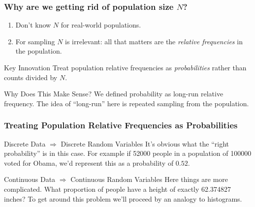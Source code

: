 \documentclass[handout]{beamer}
\begin{document}
\begin{frame}
\frametitle{Why are we getting rid of population size $N$?}

 
\begin{enumerate}
	\item Don't know $N$ for real-world populations. 
	\item For sampling $N$ is irrelevant: all that matters are the \alert{\emph{relative frequencies}} in the population. 
\end{enumerate}

\begin{block}{Key Innovation}
Treat population relative frequencies as \emph{probabilities} rather than counts divided by $N$.
\end{block}
 
\begin{block}{Why Does This Make Sense?}
We defined probability as long-run relative frequency. The idea of ``long-run'' here is repeated sampling from the population.
\end{block}

\end{frame}
\begin{frame}
\frametitle{Treating Population Relative Frequencies as Probabilities}
 
\begin{block}{Discrete Data $\Rightarrow$ Discrete Random Variables}
It's obvious what the ``right probability'' is in this case. For example if 52000 people in a population of 100000 voted for Obama, we'd represent this as a probability of $0.52$.
\end{block}

 
\begin{block}{Continuous Data $\Rightarrow$ Continuous Random Variables}
Here things are more complicated. What proportion of people have a height of exactly 62.374827 inches? To get around this problem we'll proceed by an analogy to histograms.
\end{block}

\end{frame}
\end{document}
